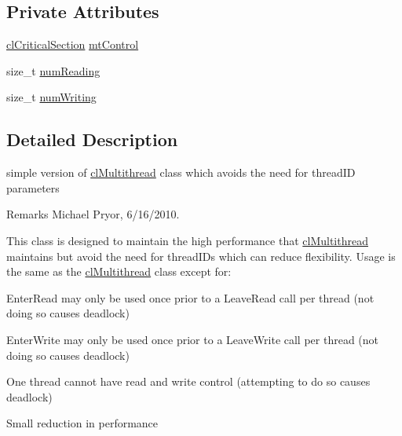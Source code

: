 \subsection*{Private Attributes}
\begin{DoxyCompactItemize}
\item 
\hyperlink{classcl_critical_section}{clCriticalSection} \hyperlink{classcl_multithread_simple_ae9cb27fad96cbc3db55ac86165e1187b}{mtControl}
\item 
size\_\-t \hyperlink{classcl_multithread_simple_ad2ab35e527c9e1ac6e249aee7639d63c}{numReading}
\item 
size\_\-t \hyperlink{classcl_multithread_simple_aafa989579bab418fb86ff16ad4bc7db3}{numWriting}
\end{DoxyCompactItemize}


\subsection{Detailed Description}
simple version of \hyperlink{classcl_multithread}{clMultithread} class which avoids the need for threadID parameters \begin{DoxyRemark}{Remarks}
Michael Pryor, 6/16/2010.
\end{DoxyRemark}
This class is designed to maintain the high performance that \hyperlink{classcl_multithread}{clMultithread} maintains but avoid the need for threadIDs which can reduce flexibility. Usage is the same as the \hyperlink{classcl_multithread}{clMultithread} class except for:
\begin{DoxyItemize}
\item EnterRead may only be used once prior to a LeaveRead call per thread (not doing so causes deadlock)
\item EnterWrite may only be used once prior to a LeaveWrite call per thread (not doing so causes deadlock)
\item One thread cannot have read and write control (attempting to do so causes deadlock)
\item Small reduction in performance 
\end{DoxyItemize}


